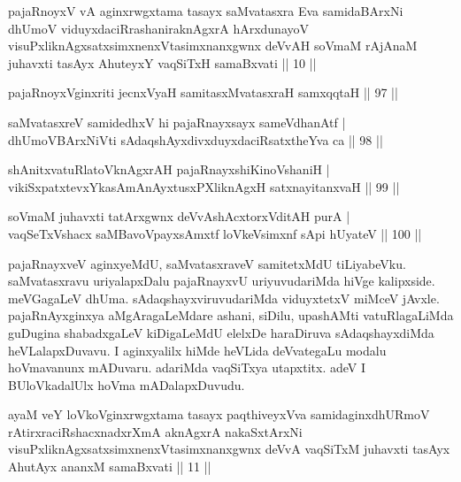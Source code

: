 \begin{kandikeshl}
pajaRnoyxV vA aginxrwgxtama tasayx saMvatasxra Eva samidaBArxNi dhUmoV viduyxdaciRrashaniraknAgxrA hArxdunayoV visuPxliknAgxsatxsimxnenxVtasimxnanxgwnx deVvAH soVmaM rAjAnaM juhavxti tasAyx AhuteyxY vaqSiTxH samaBxvati || 10 ||
\end{kandikeshl}


\begin{shl}
pajaRnoyxV\s ginxriti jecnxVyaH samitasxMvatasxraH samxqqtaH \hfill|| 97 || 
\end{shl}

\begin{shl}
saMvatasxreV samidedhxV hi pajaRnayxsayx sameVdhanAtf | \\
dhUmoV\s BArxNiVti sAdaqshAyxdivxduyxdaciRsatxtheYva ca \hfill|| 98 || 
\end{shl}

\begin{shl}
shAnitxvatuRlatoV\s knAgxrAH pajaRnayxshiKinoV\s shaniH | \\
vikiSxpatxtevxYkasAmAnAyxtusxPXliknAgxH satxnayitanxvaH \hfill|| 99 || 
\end{shl}

\begin{shl}
soVmaM juhavxti tatArxgwnx deVvAshAcxtorxVditAH purA | \\
vaqSeTxVshacx saMBavoV\s payxsAmxtf loVkeV\s simxnf sApi hUyateV \hfill|| 100 || 
\end{shl}

\begin{artha}
pajaRnayxveV aginxyeMdU, saMvatasxraveV samitetxMdU tiLiyabeVku.\break 
saMvatasxravu uriyalapxDalu pajaRnayxvU uriyuvudariMda hiVge 
kalipxside. meVGagaLeV dhUma. sAdaqshayxviruvudariMda viduyxtetxV 
miMceV jAvxle. pajaRnAyxginxya aMgAragaLeMdare ashani, siDilu, 
upashAMti vatuRlagaLiMda guDugina shabadxgaLeV kiDigaLeMdU elelxDe 
haraDiruva sAdaqshayxdiMda heVLalapxDuvavu. I aginxyalilx hiMde 
heVLida deVvategaLu modalu hoVmavanunx mADuvaru. adariMda vaqSiTxya 
utapxtitx. adeV I BUloVkadalUlx hoVma mADalapxDuvudu.
\end{artha}




\begin{kandikeshl}
ayaM veY loVkoV\s ginxrwgxtama tasayx paqthiveyxVva samidaginxdhURmoV rAtirxraciRshacxnadxrXmA aknAgxrA nakaSxtArxNi visuPxliknAgxsatxsimxnenxVtasimxnanxgwnx deVvA vaqSiTxM juhavxti tasAyx AhutAyx ananxM samaBxvati || 11 ||
\end{kandikeshl}

